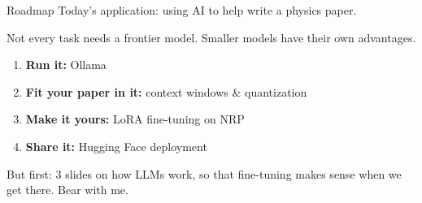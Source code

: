 \documentclass[aspectratio=169]{beamer}
\begin{document}
\begin{frame}{Roadmap}
    Today's application: using AI to help write a physics paper.

    \vspace{0.3em}
    Not every task needs a frontier model. Smaller models have their own advantages.

    \vspace{1em}
    \begin{enumerate}
        \vspace{0.3em}
        \item \textbf{Run it:} Ollama
        \vspace{0.3em}
        \item \textbf{Fit your paper in it:} context windows \& quantization
        \vspace{0.3em}
        \item \textbf{Make it yours:} LoRA fine-tuning on NRP
        \vspace{0.3em}
        \item \textbf{Share it:} Hugging Face deployment
    \end{enumerate}

    \vspace{1em}
    But first: 3 slides on how LLMs work, so that fine-tuning makes sense when we get there. Bear with me.
\end{frame}

\end{document}
